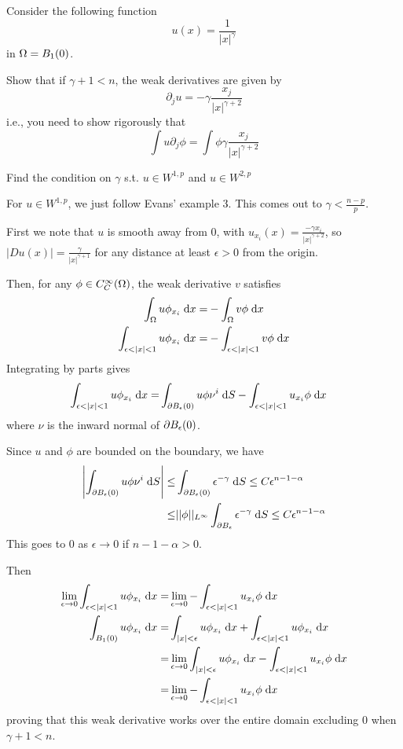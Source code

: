 Consider the following function
$$
u(x) = \frac{1}{|x|^\gamma}
$$
in $\Omega = B_1(0)$.

Show that if $\gamma + 1 < n$, the weak derivatives are given by
$$
\partial_j u = -\gamma \frac{x_j}{|x|^{\gamma + 2}}
$$
i.e., you need to show rigorously that
$$
\int u \partial_j \phi = \int \phi \gamma \frac{x_j}{|x|^{\gamma + 2}}
$$

Find the condition on $\gamma$ s.t. $u \in W^{1, p}$ and $u \in W^{2, p}$

For $u \in W^{1, p}$, we just follow Evans' example 3.
This comes out to $\gamma < \frac{n - p}{p}$.

First we note that $u$ is smooth away from $0$, with
$u_{x_i}(x) = \frac{-\gamma x_i}{|x|^{\gamma + 2}}$, so
$|D u(x)| = \frac{\gamma}{|x|^{\gamma + 1}}$
for any distance at least $\epsilon > 0$ from the origin.

Then, for any $\phi \in C^\infty_C(\Omega)$, the weak derivative $v$ satisfies
\begin{align*}
  \int_{\Omega} u \phi_{x_i} \;\mathrm{d}x = &-\int_{\Omega} v \phi \;\mathrm{d}x\\
  \int_{\epsilon < |x| < 1} u \phi_{x_i} \;\mathrm{d}x = &-\int_{\epsilon < |x| < 1} v \phi \;\mathrm{d}x
\end{align*}
Integrating by parts gives
\begin{align*}
  \int_{\epsilon < |x| < 1} u \phi_{x_i} \;\mathrm{d}x = &\int_{\partial B_\epsilon(0)} u \phi \nu^i \;\mathrm{d}S
                                        - \int_{\epsilon < |x| < 1} u_{x_i} \phi \;\mathrm{d}x
\end{align*}
where $\nu$ is the inward normal of $\partial B_\epsilon(0)$.

Since $u$ and $\phi$ are bounded on the boundary, we have
\begin{align*}
\left| \int_{\partial B_\epsilon(0)} u \phi \nu^i \;\mathrm{d}S \right|
  \leq &\int_{\partial B_\epsilon(0)} \epsilon^{-\gamma} \;\mathrm{d}S \leq C \epsilon^{n - 1 - \alpha}\\
  \leq &||\phi||_{L^\infty} \int_{\partial B_\epsilon} \epsilon^{-\gamma} \;\mathrm{d}S \leq C \epsilon^{n - 1 - \alpha}
\end{align*}
This goes to $0$ as $\epsilon \rightarrow 0$ if $n - 1 - \alpha > 0$.

Then
\begin{align*}
  \lim \limits_{\epsilon \rightarrow 0} \int_{\epsilon < |x| < 1} u \phi_{x_i} \;\mathrm{d}x
    = &\lim \limits_{\epsilon \rightarrow 0} -\int_{\epsilon < |x| < 1} u_{x_i} \phi \;\mathrm{d}x\\
  \int_{B_1(0)} u \phi_{x_i} \;\mathrm{d}x = &\int_{|x| < \epsilon} u \phi_{x_i} \;\mathrm{d}x + \int_{\epsilon < |x| < 1} u \phi_{x_i} \;\mathrm{d}x\\
    = &\lim \limits_{\epsilon \rightarrow 0} \int_{|x| < \epsilon} u \phi_{x_i} \;\mathrm{d}x - \int_{\epsilon < |x| < 1} u_{x_i} \phi \;\mathrm{d}x\\
    = &\lim \limits_{\epsilon \rightarrow 0} -\int_{\epsilon < |x| < 1} u_{x_i} \phi \;\mathrm{d}x
\end{align*}
proving that this weak derivative works over the entire domain excluding $0$ when $\gamma + 1 < n$.

